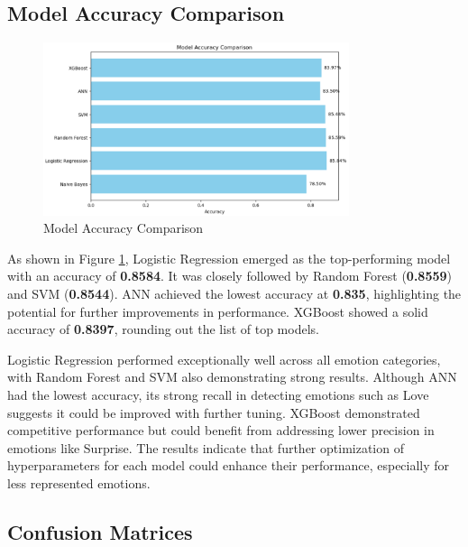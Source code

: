 \subsection{Model Accuracy Comparison}
\begin{figure}[h!]
\centering
\includegraphics[width=0.8\textwidth]{model_accuracy.png}
\caption{Model Accuracy Comparison}
\label{fig:model_accuracy}
\end{figure}

As shown in Figure \ref{fig:model_accuracy}, Logistic Regression emerged as the top-performing model with an accuracy of \textbf{0.8584}. It was closely followed by Random Forest (\textbf{0.8559}) and SVM (\textbf{0.8544}). ANN achieved the lowest accuracy at \textbf{0.835}, highlighting the potential for further improvements in performance. XGBoost showed a solid accuracy of \textbf{0.8397}, rounding out the list of top models.

Logistic Regression performed exceptionally well across all emotion categories, with Random Forest and SVM also demonstrating strong results. Although ANN had the lowest accuracy, its strong recall in detecting emotions such as Love suggests it could be improved with further tuning. XGBoost demonstrated competitive performance but could benefit from addressing lower precision in emotions like Surprise. The results indicate that further optimization of hyperparameters for each model could enhance their performance, especially for less represented emotions.

\clearpage



\subsection{Confusion Matrices}

